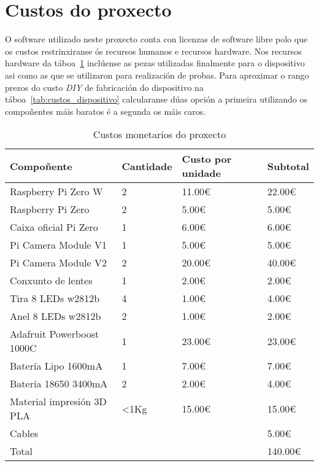 \section{Custos do proxecto}
O software utilizado neste proxecto conta con licenzas de software libre polo que os custos restrinxiranse ós recursos humanos e recursos hardware.
Nos recursos hardware da táboa~\ref{tab:custos_hardware} inclúense as pezas utilizadas finalmente para o dispositivo asi como as que se utilizaron para realización de probas. Para aproximar o rango prezos do custo \emph{DIY} de fabricación do dispositivo  na táboa~\ref{tab:custos_dispositivo} calcularanse dúas opción a primeira utilizando os compoñentes máis baratos é a segunda os máis caros.


\begin{table}[tbp]
    \label{tab:custos_hardware}
    \caption{Custos monetarios do proxecto}
    \begin{center}
        \begin{tabular}{|l|l|l|l|}
            \hline
             Compoñente & Cantidade & Custo por unidade & Subtotal\\ \hline
             Raspberry Pi Zero W & 2 & 11.00€ & 22.00€ \\ \hline
             Raspberry Pi Zero & 2 & 5.00€ & 5.00€ \\ \hline
             Caixa oficial Pi Zero & 1 & 6.00€ & 6.00€ \\ \hline
             Pi Camera Module V1 & 1 & 5.00€ & 5.00€ \\ \hline
             Pi Camera Module V2 & 2 & 20.00€ & 40.00€ \\ \hline
             Conxunto de lentes & 1 & 2.00€ & 2.00€ \\ \hline
             Tira 8 LEDs w2812b & 4 & 1.00€ & 4.00€\\ \hline
             Anel 8 LEDs w2812b & 2 & 1.00€ & 2.00€ \\ \hline
             Adafruit Powerboost 1000C & 1 & 23.00€ & 23.00€ \\ \hline
             Batería Lipo 1600mA & 1 & 7.00€ & 7.00€\\ \hline
             Batería 18650 3400mA & 2 & 2.00€ & 4.00€ \\ \hline
             Material impresión 3D PLA & <1Kg & 15.00€ & 15.00€ \\ \hline
             Cables &  &  & 5.00€ \\ \hline
             Total &  &  & 140.00€ \\ \hline
        \end{tabular}
    \end{center}
\end{table}

